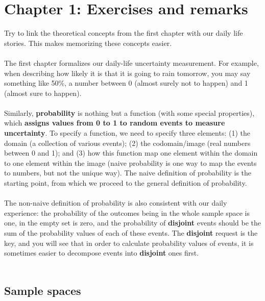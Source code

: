 

\chapter{Chapter 1: Exercises and remarks}

Try to link the theoretical concepts from the first chapter with our daily life stories. This makes memorizing these concepts easier.\\~\\
The first chapter formalizes our daily-life uncertainty measurement. For example, when describing how likely it is that it is going to rain tomorrow, you may say something like 50\%, a number between 0 (almost surely not to happen) and 1 (almost sure to happen). \\~\\
Similarly, \textbf{probability} is nothing but a function (with some special properties),
which \textbf{assigns values from 0 to 1 to random events to measure
	uncertainty}. To specify a function, we need to specify three elements:
(1) the domain (a collection of various events); (2) the codomain/image (real numbers between 0 and 1); and (3) how this function
map one element within the domain to one element within the image (naive probability is one way to map the events to numbers, but not the unique way).
The naive definition of probability is the starting point, from which we proceed to the general definition of probability.\\~\\
The non-naive definition of probability is also consistent with our daily experience: the probability of the outcomes being in the whole sample space is one, in the empty set is zero, and the probability of \textbf{disjoint} events should be the sum of the probability values of each of these events. The \textbf{disjoint} request is the key, and you will see that in order to calculate probability values of events, it is sometimes easier to decompose events into \textbf{disjoint} ones first. \\~~\\ 

\section{Sample spaces}
\label{sec:section-1.1}


